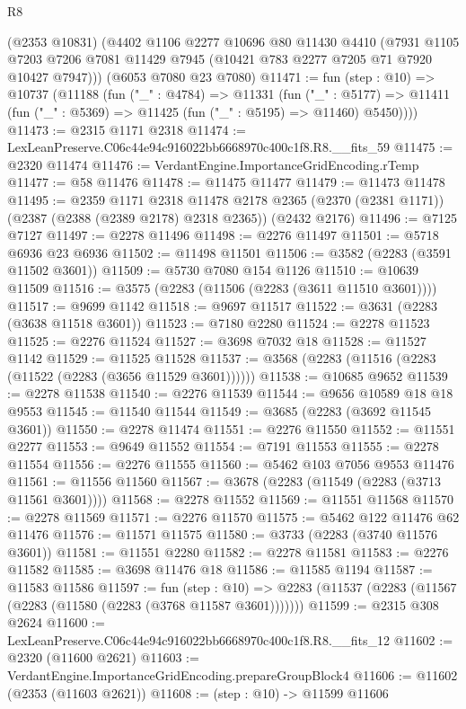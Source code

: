 \begin{lexlean}{R8}
\begin{coremodule}
    (@2353 @10831)
    (@4402
      @1106
      @2277
      @10696
      @80
      @11430
      @4410
      (@7931 @1105 @7203 @7206 @7081 @11429 @7945 (@10421 @783 @2277 @7205 @71 @7920 @10427 @7947)))
    (@6053 @7080 @23 @7080)
@11471 := fun (step : @10) =>
  @10737
    (@11188
      (fun ("_" : @4784) =>
      @11331
        (fun ("_" : @5177) =>
        @11411 (fun ("_" : @5369) => @11425 (fun ("_" : @5195) => @11460) @5450))))
@11473 := @2315 @1171 @2318
@11474 := LexLeanPreserve.C06c44e94c916022bb6668970c400c1f8.R8.__fits_59
@11475 := @2320 @11474
@11476 := VerdantEngine.ImportanceGridEncoding.rTemp
@11477 := @58 @11476
@11478 := @11475 @11477
@11479 := @11473 @11478
@11495 := @2359
    @1171
    @2318
    @11478
    @2178
    @2365
    (@2370 (@2381 @1171))
    (@2387 (@2388 (@2389 @2178) @2318 @2365))
    (@2432 @2176)
@11496 := @7125 @7127
@11497 := @2278 @11496
@11498 := @2276 @11497
@11501 := @5718 @6936 @23 @6936
@11502 := @11498 @11501
@11506 := @3582 (@2283 (@3591 @11502 @3601))
@11509 := @5730 @7080 @154 @1126
@11510 := @10639 @11509
@11516 := @3575 (@2283 (@11506 (@2283 (@3611 @11510 @3601))))
@11517 := @9699 @1142
@11518 := @9697 @11517
@11522 := @3631 (@2283 (@3638 @11518 @3601))
@11523 := @7180 @2280
@11524 := @2278 @11523
@11525 := @2276 @11524
@11527 := @3698 @7032 @18
@11528 := @11527 @1142
@11529 := @11525 @11528
@11537 := @3568 (@2283 (@11516 (@2283 (@11522 (@2283 (@3656 @11529 @3601))))))
@11538 := @10685 @9652
@11539 := @2278 @11538
@11540 := @2276 @11539
@11544 := @9656 @10589 @18 @18 @9553
@11545 := @11540 @11544
@11549 := @3685 (@2283 (@3692 @11545 @3601))
@11550 := @2278 @11474
@11551 := @2276 @11550
@11552 := @11551 @2277
@11553 := @9649 @11552
@11554 := @7191 @11553
@11555 := @2278 @11554
@11556 := @2276 @11555
@11560 := @5462 @103 @7056 @9553 @11476
@11561 := @11556 @11560
@11567 := @3678 (@2283 (@11549 (@2283 (@3713 @11561 @3601))))
@11568 := @2278 @11552
@11569 := @11551 @11568
@11570 := @2278 @11569
@11571 := @2276 @11570
@11575 := @5462 @122 @11476 @62 @11476
@11576 := @11571 @11575
@11580 := @3733 (@2283 (@3740 @11576 @3601))
@11581 := @11551 @2280
@11582 := @2278 @11581
@11583 := @2276 @11582
@11585 := @3698 @11476 @18
@11586 := @11585 @1194
@11587 := @11583 @11586
@11597 := fun (step : @10) =>
  @2283 (@11537 (@2283 (@11567 (@2283 (@11580 (@2283 (@3768 @11587 @3601)))))))
@11599 := @2315 @308 @2624
@11600 := LexLeanPreserve.C06c44e94c916022bb6668970c400c1f8.R8.__fits_12
@11602 := @2320 (@11600 @2621)
@11603 := VerdantEngine.ImportanceGridEncoding.prepareGroupBlock4
@11606 := @11602 (@2353 (@11603 @2621))
@11608 := (step : @10) -> @11599 @11606

\end{coremodule}
\end{lexlean}
